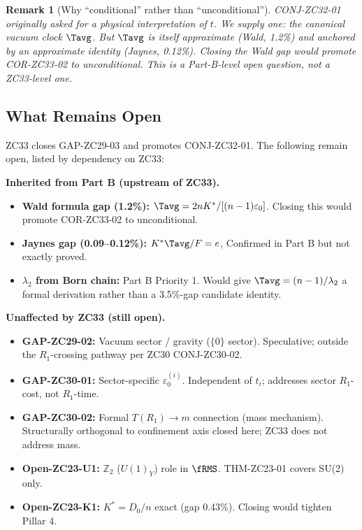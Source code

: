 \documentclass[12pt, a4paper]{article}
\newtheorem{remark}{Remark}[section]
\begin{document}
\begin{remark}[Why ``conditional'' rather than ``unconditional'']
CONJ-ZC32-01 originally asked for a \emph{physical}
interpretation of $t$. We supply one: the canonical vacuum
clock $\Tavg$. But $\Tavg$ is itself approximate (Wald,
1.2\%) and anchored by an approximate identity (Jaynes,
0.12\%). Closing the Wald gap would promote COR-ZC33-02
to unconditional. This is a Part-B-level open question,
not a ZC33-level one.
\end{remark}

\subsection{What Remains Open}
\label{sec:open}

ZC33 closes GAP-ZC29-03 and promotes CONJ-ZC32-01.
The following remain open, listed by dependency on ZC33:

\begin{openqbox}[title={Open items after ZC33}]
\textbf{Inherited from Part B (upstream of ZC33).}
\begin{itemize}[leftmargin=*, noitemsep]
\item \textbf{Wald formula gap (1.2\%):} $\Tavg = 2nK^*/
  [(n-1)\varepsilon_0]$. Closing this would promote
  COR-ZC33-02 to unconditional.
\item \textbf{Jaynes gap (0.09--0.12\%):} $K^*\Tavg/F = e$,
  Confirmed in Part B but not exactly proved.
\item \textbf{$\lambda_2$ from Born chain:} Part B Priority 1.
  Would give $\Tavg = (n-1)/\lambda_2$ a formal derivation
  rather than a 3.5\%-gap candidate identity.
\end{itemize}

\textbf{Unaffected by ZC33 (still open).}
\begin{itemize}[leftmargin=*, noitemsep]
\item \textbf{GAP-ZC29-02:} Vacuum sector / gravity ($\{0\}$
  sector). Speculative; outside the $R_1$-crossing pathway
  per ZC30 CONJ-ZC30-02.
\item \textbf{GAP-ZC30-01:} Sector-specific $\varepsilon_0^{(i)}$.
  Independent of $t_i$; addresses sector $R_1$-cost, not
  $R_1$-time.
\item \textbf{GAP-ZC30-02:} Formal $T(R_1) \to m$ connection
  (mass mechanism). Structurally orthogonal to confinement
  axis closed here; ZC33 does not address mass.
\item \textbf{Open-ZC23-U1:} $\mathbb{Z}_2$ ($U(1)_Y$) role in
  $\fRMS$. THM-ZC23-01 covers SU(2) only.
\item \textbf{Open-ZC23-K1:} $K^* = D_0/n$ exact (gap 0.43\%).
  Closing would tighten Pillar 4.
\end{itemize}
\end{openqbox}
\end{document}
